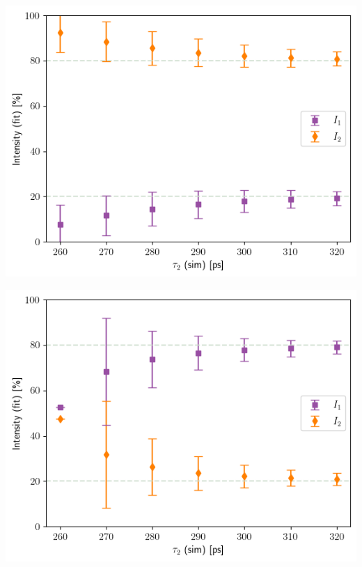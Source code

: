 \begin{minipage}{ .47\linewidth}
    \includegraphics[width=\linewidth]{Batch 3/regular IRF/tau1 220/output/plotfin/2080.png}
    \label{fig:220-2080}
\end{minipage}
\hfill
\begin{minipage}{ .47\linewidth}
     
    \includegraphics[width=\linewidth]{Batch 3/regular IRF/tau1 220/output/plotfin/8020.png}
    \label{fig:220-8020}
\end{minipage}
